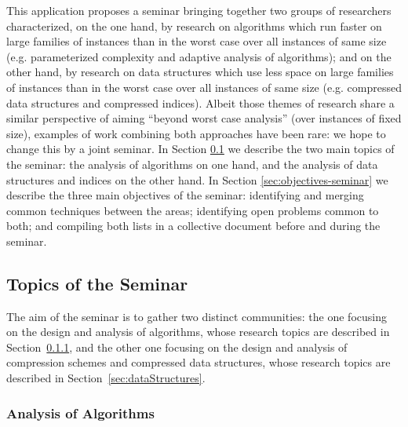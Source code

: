 \documentclass[a4paper,10pt]{article}
\begin{document}
This application proposes a seminar bringing together two groups of researchers characterized, on the one hand, by research on algorithms which run faster on large families of instances than in the worst case over all instances of same size  (e.g. parameterized complexity and adaptive analysis of algorithms); and on the other hand, by research on data structures which use less space on large families of instances than in the worst case over all instances of same size (e.g. compressed data structures and compressed indices). 
%
Albeit those themes of research share a similar perspective of aiming ``beyond worst case analysis'' (over instances of fixed size), examples of work combining both approaches have been rare: we hope to change this by a joint seminar.  
%
In Section \ref{sec:topics-seminar} we describe the two main topics of the seminar: the analysis of algorithms on one hand, and the analysis of data structures and indices on the other hand. In Section \ref{sec:objectives-seminar} we describe the three main objectives of the seminar: identifying and merging common techniques between the areas; identifying open problems common to both; and compiling both lists in a collective document before and during the seminar.


\subsection{Topics of the Seminar}
\label{sec:topics-seminar}

The aim of the seminar is to gather two distinct communities: the one focusing on the design and analysis of algorithms, whose research topics are described in Section~\ref{sec:algorithms}, and the other one focusing on the design and analysis of compression schemes and compressed data structures, whose research topics are described in Section~\ref{sec:dataStructures}.

\subsubsection{Analysis of Algorithms}
\label{sec:algorithms}
\end{document}
